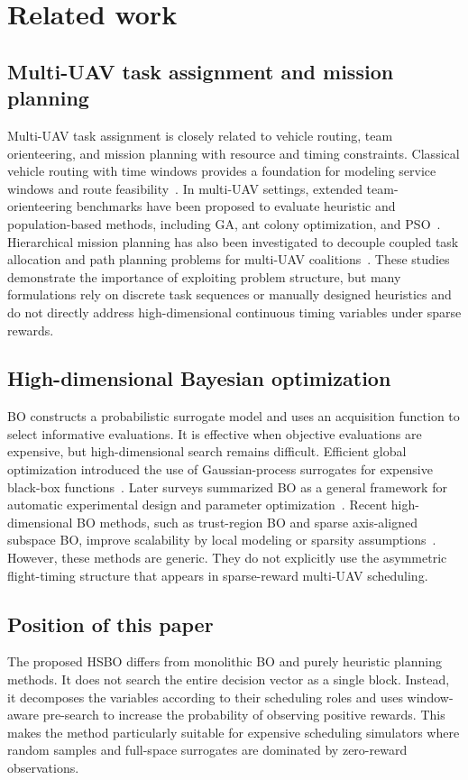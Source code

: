 \documentclass[twocolumn]{article}
\begin{document}
\section{Related work}
\subsection{Multi-UAV task assignment and mission planning}
Multi-UAV task assignment is closely related to vehicle routing, team orienteering, and mission planning with resource and timing constraints. Classical vehicle routing with time windows provides a foundation for modeling service windows and route feasibility~\cite{vrptw}. In multi-UAV settings, extended team-orienteering benchmarks have been proposed to evaluate heuristic and population-based methods, including GA, ant colony optimization, and PSO~\cite{multi_uav_benchmark}. Hierarchical mission planning has also been investigated to decouple coupled task allocation and path planning problems for multi-UAV coalitions~\cite{hier_mission}. These studies demonstrate the importance of exploiting problem structure, but many formulations rely on discrete task sequences or manually designed heuristics and do not directly address high-dimensional continuous timing variables under sparse rewards.

\subsection{High-dimensional Bayesian optimization}
BO constructs a probabilistic surrogate model and uses an acquisition function to select informative evaluations. It is effective when objective evaluations are expensive, but high-dimensional search remains difficult. Efficient global optimization introduced the use of Gaussian-process surrogates for expensive black-box functions~\cite{ego,gpml}. Later surveys summarized BO as a general framework for automatic experimental design and parameter optimization~\cite{bo_review}. Recent high-dimensional BO methods, such as trust-region BO and sparse axis-aligned subspace BO, improve scalability by local modeling or sparsity assumptions~\cite{turbo,saasbo}. However, these methods are generic. They do not explicitly use the asymmetric flight-timing structure that appears in sparse-reward multi-UAV scheduling.

\subsection{Position of this paper}
The proposed HSBO differs from monolithic BO and purely heuristic planning methods. It does not search the entire decision vector as a single block. Instead, it decomposes the variables according to their scheduling roles and uses window-aware pre-search to increase the probability of observing positive rewards. This makes the method particularly suitable for expensive scheduling simulators where random samples and full-space surrogates are dominated by zero-reward observations.
\end{document}
